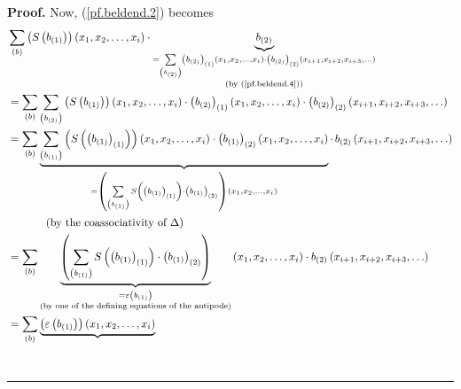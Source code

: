 \documentclass[numbers=enddot,12pt,final,onecolumn,notitlepage,abstracton]{scrartcl}%
\theoremstyle{definition}
\newenvironment{proof}[1][Proof]{\noindent\textbf{#1.} }{\ \rule{0.5em}{0.5em}}
\newenvironment{noncompile}{}{}
\let\sumnonlimits\sum
\renewcommand{\sum}{\sumnonlimits\limits}
\begin{document}
\begin{noncompile}
\begin{proof}
Now, (\ref{pf.beldend.2}) becomes%
\begin{align*}
&  \sum_{\left(  b\right)  }\left(  S\left(  b_{\left(  1\right)  }\right)
\right)  \left(  x_{1},x_{2},\ldots,x_{i}\right)  \cdot\underbrace{b_{\left(
2\right)  }}_{\substack{=\sum_{\left(  b_{\left(  2\right)  }\right)  }\left(
b_{\left(  2\right)  }\right)  _{\left(  1\right)  }\left(  x_{1},x_{2}%
,\ldots,x_{i}\right)  \cdot\left(  b_{\left(  2\right)  }\right)  _{\left(
2\right)  }\left(  x_{i+1},x_{i+2},x_{i+3},\ldots\right)  \\\text{(by
(\ref{pf.beldend.4}))}}}\\
&  =\sum_{\left(  b\right)  }\sum_{\left(  b_{\left(  2\right)  }\right)
}\left(  S\left(  b_{\left(  1\right)  }\right)  \right)  \left(  x_{1}%
,x_{2},\ldots,x_{i}\right)  \cdot\left(  b_{\left(  2\right)  }\right)
_{\left(  1\right)  }\left(  x_{1},x_{2},\ldots,x_{i}\right)  \cdot\left(
b_{\left(  2\right)  }\right)  _{\left(  2\right)  }\left(  x_{i+1}%
,x_{i+2},x_{i+3},\ldots\right) \\
&  =\sum_{\left(  b\right)  }\underbrace{\sum_{\left(  b_{\left(  1\right)
}\right)  }\left(  S\left(  \left(  b_{\left(  1\right)  }\right)  _{\left(
1\right)  }\right)  \right)  \left(  x_{1},x_{2},\ldots,x_{i}\right)
\cdot\left(  b_{\left(  1\right)  }\right)  _{\left(  2\right)  }\left(
x_{1},x_{2},\ldots,x_{i}\right)  }_{=\left(  \sum_{\left(  b_{\left(
1\right)  }\right)  }S\left(  \left(  b_{\left(  1\right)  }\right)  _{\left(
1\right)  }\right)  \cdot\left(  b_{\left(  1\right)  }\right)  _{\left(
2\right)  }\right)  \left(  x_{1},x_{2},\ldots,x_{i}\right)  }\cdot
\,b_{\left(  2\right)  }\left(  x_{i+1},x_{i+2},x_{i+3},\ldots\right) \\
&  \ \ \ \ \ \ \ \ \ \ \left(  \text{by the coassociativity of }\Delta\right)
\\
&  =\sum_{\left(  b\right)  }\underbrace{\left(  \sum_{\left(  b_{\left(
1\right)  }\right)  }S\left(  \left(  b_{\left(  1\right)  }\right)  _{\left(
1\right)  }\right)  \cdot\left(  b_{\left(  1\right)  }\right)  _{\left(
2\right)  }\right)  }_{\substack{=\varepsilon\left(  b_{\left(  1\right)
}\right)  \\\text{(by one of the defining equations of the antipode)}}}\left(
x_{1},x_{2},\ldots,x_{i}\right)  \cdot b_{\left(  2\right)  }\left(
x_{i+1},x_{i+2},x_{i+3},\ldots\right) \\
&  =\sum_{\left(  b\right)  }\underbrace{\left(  \varepsilon\left(  b_{\left(
1\right)  }\right)  \right)  \left(  x_{1},x_{2},\ldots,x_{i}\right)
}
\end{align*}
\end{proof}
\end{noncompile}
\end{document}
